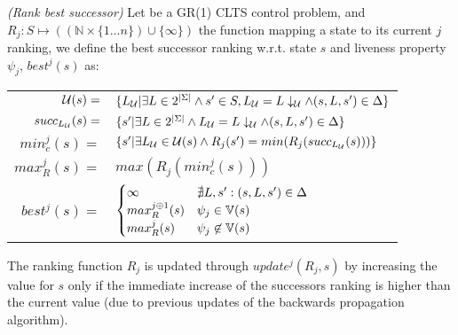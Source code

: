 \begin{definition}\label{def:gr1_rank_best} \emph{(Rank best successor)} 
	Let \controlProblemDef be a GR(1) CLTS control problem, and $R_j: S \mapsto ((\mathbb{N} \times \{1 \ldots n\}) \cup \{\infty \})$ the function mapping a state to its current $j$ ranking, we define the best successor ranking w.r.t. state $s$ and liveness property $\psi_j$, $best^j(s)$ as:
	\begin{center}
		\begin{tabular}{r l}
			$\mathcal{U}(s)=$&$ \{L_{\mathcal{U}} | \exists L \in 2^{|\Sigma|} \wedge s' \in S, L_{\mathcal{U}} = L\downarrow_{\mathcal{U}}  \wedge (s,L, s') \in \Delta \} $\\
			$succ_{L_{\mathcal{U}}}(s)=$ & $ \{s' | \exists L \in 2^{|\Sigma|} \wedge L_{\mathcal{U}} = L\downarrow_{\mathcal{U}}  \wedge (s,L, s') \in \Delta \} $ \\
			$min_c^j(s)=$ & $ \{s' | \exists L_{\mathcal{U}} \in \mathcal{U}(s) \wedge R_j(s') = min(R_j(succ_{L_{\mathcal{U}}}(s))) \} $ \\			
			$max_R^j(s)=$ & $max(R_j(min_c^j(s)))$ \\						
			$best^j(s) = $ & $\begin{cases}
			\infty & \nexists L, s' : (s,L,s') \in \Delta\\
			max_R^{j \oplus 1}(s) & \psi_j \in \mathbb{V}(s)\\			
			max_R^{j}(s) & \psi_j \not\in \mathbb{V}(s)\\			
			\end{cases}$\\
		\end{tabular}
	\end{center}
\end{definition}

The ranking function $R_j$ is updated through $update^j(R_j,s)$ by increasing the value for $s$ only if the immediate increase of the successors ranking is higher than the current value (due to previous updates of the backwards propagation algorithm).


